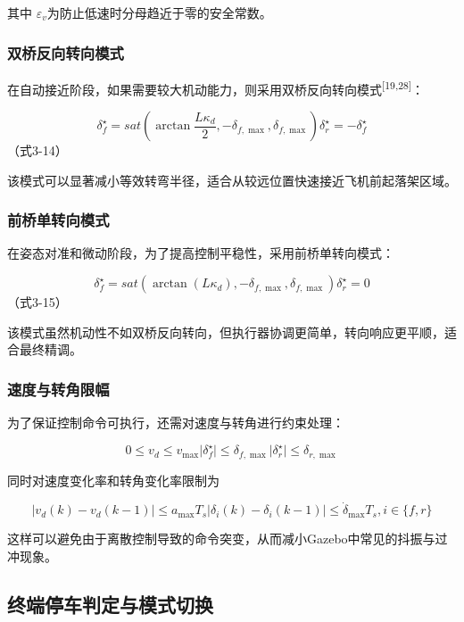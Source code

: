 \documentclass[UTF8,a4paper,12pt]{ctexart}
\begin{document}
其中 \(\varepsilon_{v}\)为防止低速时分母趋近于零的安全常数。

\subsubsection{双桥反向转向模式}\label{_Toc228997212}

在自动接近阶段，如果需要较大机动能力，则采用双桥反向转向模式\textsuperscript{[19,28]}：

\[{\delta_{f}^{\star} = sat\left( \arctan\frac{L\kappa_{d}}{2}, - \delta_{f,\max},\delta_{f,\max} \right)
}{\delta_{r}^{\star} = - \delta_{f}^{\star}
}\]（式3-14）

该模式可以显著减小等效转弯半径，适合从较远位置快速接近飞机前起落架区域。

\subsubsection{前桥单转向模式}\label{_Toc228997213}

在姿态对准和微动阶段，为了提高控制平稳性，采用前桥单转向模式：

\[{\delta_{f}^{\star} = sat\left( \arctan(L\kappa_{d}), - \delta_{f,\max},\delta_{f,\max} \right)
}{\delta_{r}^{\star} = 0
}\]（式3-15）

该模式虽然机动性不如双桥反向转向，但执行器协调更简单，转向响应更平顺，适合最终精调。

\subsubsection{速度与转角限幅}\label{_Toc228997214}

为了保证控制命令可执行，还需对速度与转角进行约束处理：

\[{0 \leq v_{d} \leq v_{\max}
}{\mid \delta_{f}^{\star} \mid \leq \delta_{f,\max}
}{\mid \delta_{r}^{\star} \mid \leq \delta_{r,\max}
}\]

同时对速度变化率和转角变化率限制为

\[{\mid v_{d}(k) - v_{d}(k - 1) \mid \leq a_{\max}T_{s}
}{\mid \delta_{i}(k) - \delta_{i}(k - 1) \mid \leq {\dot{\delta}}_{\max}T_{s},i \in \{ f,r\}
}\]

这样可以避免由于离散控制导致的命令突变，从而减小Gazebo中常见的抖振与过冲现象。

\subsection{终端停车判定与模式切换}\label{_Toc228997215}
\end{document}
